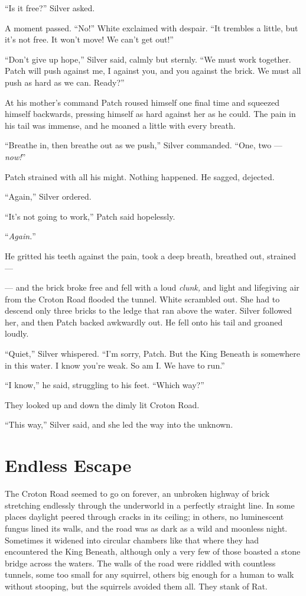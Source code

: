\documentclass[ebook,oneside,openany,17pt]{memoir}
\newenvironment{tolerant}[1]{%
  \par\tolerance=#1\relax
}{%
  \par
}
\renewcommand{\thechapter}{\Roman{chapter}}
\newcounter{sections}
\newcommand{\sections}[1]{%
  \section*{#1}
  \addtocounter{sections}{1}%
  \pdfbookmark[1]{#1}{section.\thechapter.\thesections}}
\begin{document}
“Is it free?” Silver asked.

A moment passed. “No!” White exclaimed with despair. “It trembles a
little, but it’s not free. It won’t move! We can’t get out!”

\begin{tolerant}{1000}
“Don’t give up hope,” Silver said, calmly but stern\-ly. “We must work
together. Patch will push against me, I against you, and you against
the brick. We must all push as hard as we can. Ready?”
\end{tolerant}

\begin{tolerant}{1000}
At his mother’s command Patch roused himself one final time and
squeezed himself backwards, pressing himself as hard against her as he
could. The pain in his tail was immense, and he moaned a little with
every breath.
\end{tolerant}

“Breathe in, then breathe out as we push,” Silver commanded. “One, two
— \emph{now!}”

Patch strained with all his might. Nothing happened. He sagged,
dejected.

“Again,” Silver ordered.

“It’s not going to work,” Patch said hopelessly.

“\emph{Again.}”

He gritted his teeth against the pain, took a deep breath, breathed
out, strained —

— and the brick broke free and fell with a loud \emph{clunk,} and
light and lifegiving air from the Croton Road flooded the
tunnel. White scrambled out. She had to descend only three bricks to
the ledge that ran above the water. Silver followed her, and then
Patch backed awkwardly out. He fell onto his tail and groaned loudly.

“Quiet,” Silver whispered. “I’m sorry, Patch. But the King Beneath is
somewhere in this water. I know you’re weak. So am I. We have to run.”

“I know,” he said, struggling to his feet. “Which way?”

They looked up and down the dimly lit Croton Road.

“This way,” Silver said, and she led the way into the unknown.


\sections{Endless Escape}

The Croton Road seemed to go on forever, an unbroken highway of brick
stretching endlessly through the underworld in a perfectly straight
line. In some places daylight peered through cracks in its ceiling; in
others, no luminescent fungus lined its walls, and the road was as
dark as a wild and moonless night. Sometimes it widened into circular
chambers like that where they had encountered the King Beneath,
although only a very few of those boasted a stone bridge across the
waters. The walls of the road were riddled with countless tunnels,
some too small for any squirrel, others big enough for a human to walk
without stooping, but the squirrels avoided them all. They stank of
Rat.
\end{document}
